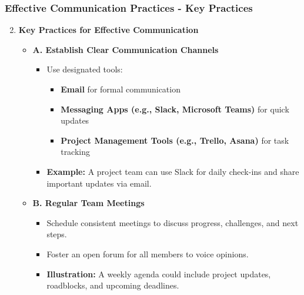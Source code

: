 \documentclass[aspectratio=169]{beamer}
\begin{document}
\begin{frame}[fragile]
    \frametitle{Effective Communication Practices - Key Practices}
    \begin{enumerate}
        \setcounter{enumi}{1} %
        \item \textbf{Key Practices for Effective Communication}
            \begin{itemize}
                \item \textbf{A. Establish Clear Communication Channels}
                    \begin{itemize}
                        \item Use designated tools: 
                        \begin{itemize}
                            \item \textbf{Email} for formal communication
                            \item \textbf{Messaging Apps (e.g., Slack, Microsoft Teams)} for quick updates
                            \item \textbf{Project Management Tools (e.g., Trello, Asana)} for task tracking
                        \end{itemize}
                        \item \textbf{Example:} A project team can use Slack for daily check-ins and share important updates via email.
                    \end{itemize}
                
                \item \textbf{B. Regular Team Meetings}
                    \begin{itemize}
                        \item Schedule consistent meetings to discuss progress, challenges, and next steps.
                        \item Foster an open forum for all members to voice opinions.
                        \item \textbf{Illustration:} A weekly agenda could include project updates, roadblocks, and upcoming deadlines.
                    \end{itemize}
            \end{itemize}
    \end{enumerate}
\end{frame}
\end{document}
